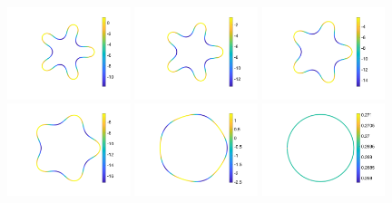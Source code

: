 \documentclass[aps,prl,showpacs]{revtex4}
\begin{document}
\begin{figure}[htp]
\begin{minipage}{0.40\textwidth}

\end{minipage}
\hfill
\begin{minipage}{0.55\textwidth}
  \centering
\includegraphics[width=0.32\textwidth]{figures/StarTensionTime1.pdf}
\includegraphics[width=0.32\textwidth]{figures/StarTensionTime2.pdf}
\includegraphics[width=0.32\textwidth]{figures/StarTensionTime3.pdf} \\
\includegraphics[width=0.32\textwidth]{figures/StarTensionTime4.pdf}
\includegraphics[width=0.32\textwidth]{figures/StarTensionTime5.pdf}
\includegraphics[width=0.32\textwidth]{figures/StarTensionTime6.pdf}

\end{minipage}
\end{figure}
\end{document}

